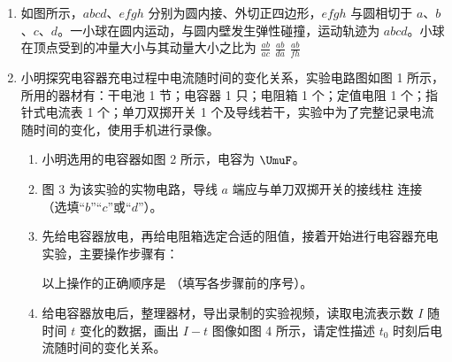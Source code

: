 \documentclass[\gkver]{gaokaozhenti}
\begin{document}
\begin{enumerate}
\item
如图所示，$abcd$、$efgh$ 分别为圆内接、外切正四边形，$efgh$ 与圆相切于 $a$、$b$、$c$、$d$。一小球在圆内运动，与圆内壁发生弹性碰撞，运动轨迹为 $abcd$。小球在顶点受到的冲量大小与其动量大小之比为
\onepicture[h=4.99cm]{}
{$\frac{ab}{ac}$}
{$\frac{ab}{da}$}
{$\frac{ab}{fh}$}

\item
小明探究电容器充电过程中电流随时间的变化关系，实验电路图如图 1 所示，所用的器材有：干电池 1 节；电容器 1 只；电阻箱 1 个；定值电阻 1 个；指针式电流表 1 个；单刀双掷开关 1 个及导线若干，实验中为了完整记录电流随时间的变化，使用手机进行录像。


\begin{enumerate}
	\item
	小明选用的电容器如图 2 所示，电容为  $\UmuF$。

	\item
	图 3 为该实验的实物电路，导线 $a$ 端应与单刀双掷开关的接线柱  连接（选填“$b$”“$c$”或“$d$”）。

	\item
	先给电容器放电，再给电阻箱选定合适的阻值，接着开始进行电容器充电实验，主要操作步骤有：
	以上操作的正确顺序是 （填写各步骤前的序号）。
	\item
	给电容器放电后，整理器材，导出录制的实验视频，读取电流表示数 $I$ 随时间 $t$ 变化的数据，画出 $I-t$ 图像如图 4 所示，请定性描述 $t_{0}$ 时刻后电流随时间的变化关系。


\end{enumerate}
\end{enumerate}
\end{document}

